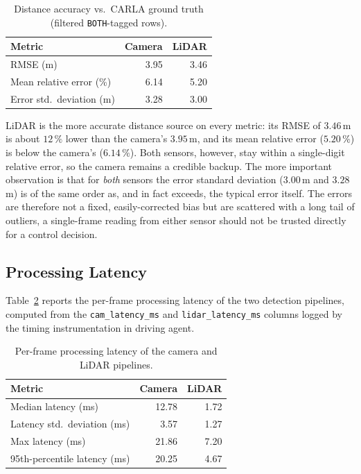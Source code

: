 \documentclass[12pt, a4paper]{report}
\begin{document}
\begin{table}[H]
\centering
\caption{Distance accuracy vs.\ CARLA ground truth (filtered \texttt{BOTH}-tagged rows).}
\label{tab:distacc}
\begin{tabular}{@{}lrr@{}}
\toprule
\textbf{Metric} & \textbf{Camera} & \textbf{LiDAR} \\
\midrule
RMSE (m)                   & 3.95 & 3.46 \\
Mean relative error (\%)   & 6.14 & 5.20 \\
Error std.\ deviation (m)  & 3.28 & 3.00 \\
\bottomrule
\end{tabular}
\end{table}

LiDAR is the more accurate distance source on every metric: its RMSE of
$3.46$\,m is about $12\,\%$ lower than the camera's $3.95$\,m, and its mean
relative error ($5.20\,\%$) is below the camera's ($6.14\,\%$). Both sensors,
however, stay within a single-digit relative error, so the camera remains a
credible backup. The more important observation is that for \emph{both} sensors
the error standard deviation ($3.00$\,m and $3.28$\,m) is of the same order as,
and in fact exceeds, the typical error itself. The errors are therefore not a
fixed, easily-corrected bias but are scattered with a long tail of outliers,
a single-frame reading from either sensor should not be trusted directly for a
control decision.

\subsection{Processing Latency}

Table~\ref{tab:latency} reports the per-frame processing latency of the two
detection pipelines, computed from the \texttt{cam\_latency\_ms} and
\texttt{lidar\_latency\_ms} columns logged by the timing instrumentation in
driving agent.

\begin{table}[H]
\centering
\caption{Per-frame processing latency of the camera and LiDAR pipelines.}
\label{tab:latency}
\begin{tabular}{@{}lrr@{}}
\toprule
\textbf{Metric} & \textbf{Camera} & \textbf{LiDAR} \\
\midrule
Median latency (ms)          & 12.78 & 1.72 \\
Latency std.\ deviation (ms) & 3.57  & 1.27 \\
Max latency (ms)             & 21.86 & 7.20 \\
95th-percentile latency (ms) & 20.25 & 4.67 \\
\bottomrule
\end{tabular}
\end{table}
\end{document}
